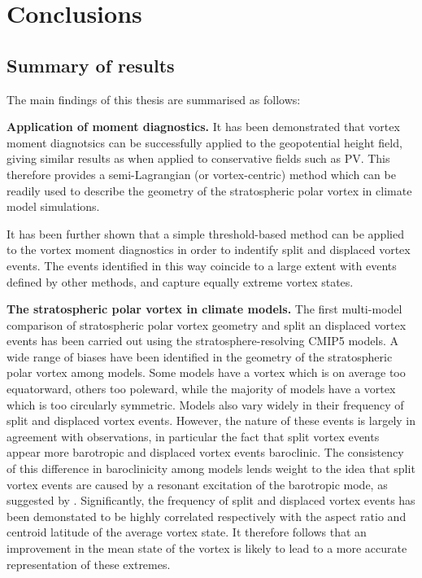 \chapter{Conclusions}
\label{cha:conclusions}

\section{Summary of results}

The main findings of this thesis are summarised as follows: 

\bigskip\noindent\textbf{Application of moment diagnostics.} It has been
demonstrated that vortex moment diagnotsics can be successfully applied to the
geopotential height field, giving similar results as when applied to
conservative fields such as PV. This therefore provides a semi-Lagrangian (or
vortex-centric) method which can be readily used to describe the geometry of the
stratospheric polar vortex in climate model simulations.

It has been further shown that a simple threshold-based method can be applied to
the vortex moment diagnostics in order to indentify split and displaced vortex
events. The events identified in this way coincide to a large extent with events
defined by other methods, and capture equally extreme vortex states.

\bigskip\noindent\textbf{The stratospheric polar vortex in climate models.} The
first multi-model comparison of stratospheric polar vortex geometry and split an
displaced vortex events has been carried out using the stratosphere-resolving
CMIP5 models. A wide range of biases have been identified in the geometry of the
stratospheric polar vortex among models. Some models have a vortex which is on
average too equatorward, others too poleward, while the majority of models have
a vortex which is too circularly symmetric. Models also vary widely in their
frequency of split and displaced vortex events. However, the nature of these
events is largely in agreement with observations, in particular the fact that
split vortex events appear more barotropic and displaced vortex events
baroclinic. The consistency of this difference in baroclinicity among models
lends weight to the idea that split vortex events are caused by a resonant
excitation of the barotropic mode, as suggested by
\citet{Esler2005}. Significantly, the frequency of split and displaced vortex
events has been demonstated to be highly correlated respectively with the aspect
ratio and centroid latitude of the average vortex state. It therefore follows
that an improvement in the mean state of the vortex is likely to lead to a more
accurate representation of these extremes.

